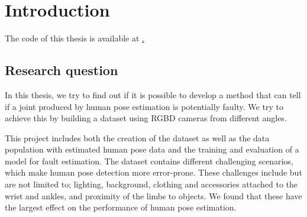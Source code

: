 \chapter{Introduction}

The code of this thesis is available at \href{https://github.com/LeonardoPohl/FESD}.

\section{Research question}

In this thesis, we try to find out if it is possible to develop a method that can tell if a joint produced by human pose estimation is potentially faulty. We try to achieve this by building a dataset using RGBD cameras from different angles.

This project includes both the creation of the dataset as well as the data population with estimated human pose data and the training and evaluation of a model for fault estimation. The dataset contains different challenging scenarios, which make human pose detection more error-prone. These challenges include but are not limited to; lighting, background, clothing and accessories attached to the wrist and ankles, and proximity of the limbs to objects. We found that these have the largest effect on the performance of human pose estimation. 
